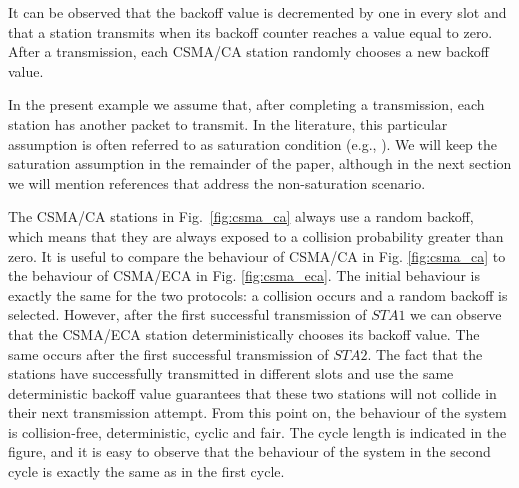 \documentclass[journal]{IEEEtran}
\begin{document}
It can be observed that the backoff value is decremented by one in every slot and that a station transmits when its backoff counter reaches a value equal to zero.
After a transmission, each CSMA/CA station randomly chooses a new backoff value.

In the present example we assume that, after completing a transmission, each station has another packet to transmit.
In the literature, this particular assumption is often referred to as saturation condition (e.g., \cite{he2009srb,barcelo2010fcc,fang2011dlm,barcelo2011tcf}).
We will keep the saturation assumption in the remainder of the paper, although in the next section we will mention references that address the non-saturation scenario.

The CSMA/CA stations in Fig.~\ref{fig:csma_ca} always use a random backoff, which means that they are always exposed to a collision probability greater than zero.
%
It is useful to compare the behaviour of CSMA/CA in Fig. \ref{fig:csma_ca} to the behaviour of CSMA/ECA in Fig. \ref{fig:csma_eca}.
The initial behaviour is exactly the same for the two protocols: a collision occurs and a random backoff is selected.
However, after the first successful transmission of $STA 1$ we can observe that the CSMA/ECA station deterministically chooses its backoff value.
The same occurs after the first successful transmission of $STA 2$.
The fact that the stations have successfully transmitted in different slots and use the same deterministic backoff value guarantees that these two stations will not collide in their next transmission attempt.
From this point on, the behaviour of the system is collision-free, deterministic, cyclic and fair.
The cycle length is indicated in the figure, and it is easy to observe that the behaviour of the system in the second cycle is exactly the same as in the first cycle.
\end{document}
